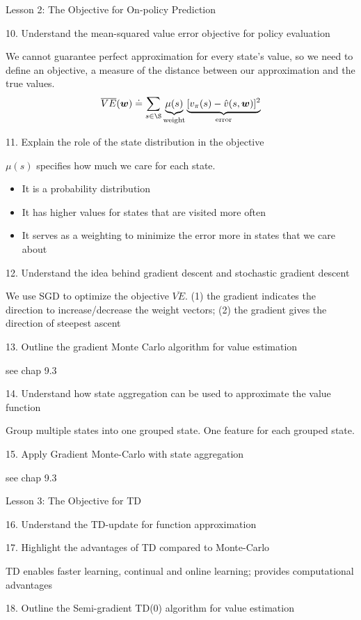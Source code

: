 \documentclass[sutton_barto_notes.tex]{subfiles}
\begin{document}
Lesson 2: The Objective for On-policy Prediction 

10. Understand the mean-squared value error objective for policy evaluation 

We cannot guarantee perfect approximation for every state's value, so we need to define an objective, a measure of the distance between our approximation and the true values.
$$\overline{VE}(\bm{w}) \doteq \sum_{s\in\S} \underbrace{\mu(s)}_{\text{weight}} \underbrace{[v_\pi(s) - \hat{v}(s,\bm{w})]^2}_{\text{error}}$$

11. Explain the role of the state distribution in the objective 

$\mu(s)$ specifies how much we care for each state.
\begin{itemize}
\item It is a probability distribution
\item It has higher values for states that are visited more often
\item It serves as a weighting to minimize the error more in states that we care about
\end{itemize}

12. Understand the idea behind gradient descent and stochastic gradient descent 

We use SGD to optimize the objective $\overline{VE}$. (1) the gradient indicates the direction to increase/decrease the weight vectors; (2) the gradient gives the direction of steepest ascent

13. Outline the gradient Monte Carlo algorithm for value estimation 

see chap 9.3

14. Understand how state aggregation can be used to approximate the value function 

Group multiple states into one grouped state. One feature for each grouped state.

15. Apply Gradient Monte-Carlo with state aggregation 

see chap 9.3

Lesson 3: The Objective for TD 

16. Understand the TD-update for function approximation 

17. Highlight the advantages of TD compared to Monte-Carlo 

TD enables faster learning, continual and online learning; provides computational advantages

18. Outline the Semi-gradient TD(0) algorithm for value estimation 
\end{document}
